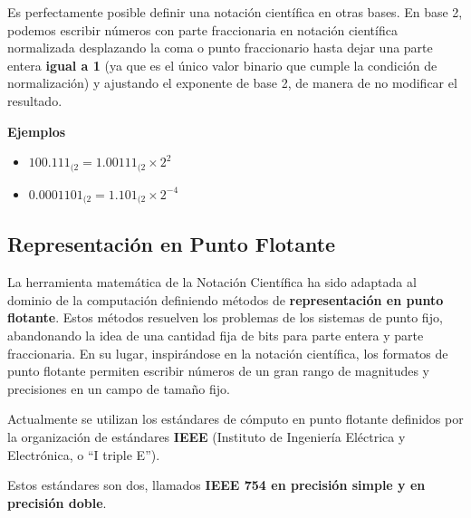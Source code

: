\documentclass[spanish,A4,]{article}
\begin{document}
Es perfectamente posible definir una notación científica en otras bases.
En base 2, podemos escribir números con parte fraccionaria en notación
científica normalizada desplazando la coma o punto fraccionario hasta
dejar una parte entera \textbf{igual a 1} (ya que es el único valor
binario que cumple la condición de normalización) y ajustando el
exponente de base 2, de manera de no modificar el resultado.

\textbf{Ejemplos}

\begin{itemize}
\itemsep1pt\parskip0pt
\item
  $100.111_{(2} = 1.00111_{(2} \times 2^2$
\item
  $0.0001101_{(2} = 1.101_{(2} \times 2^{-4}$
\end{itemize}

\subsection{Representación en Punto
Flotante}\label{representaciuxf3n-en-punto-flotante}

La herramienta matemática de la Notación Científica ha sido adaptada al
dominio de la computación definiendo métodos de \textbf{representación
en punto flotante}. Estos métodos resuelven los problemas de los
sistemas de punto fijo, abandonando la idea de una cantidad fija de bits
para parte entera y parte fraccionaria. En su lugar, inspirándose en la
notación científica, los formatos de punto flotante permiten escribir
números de un gran rango de magnitudes y precisiones en un campo de
tamaño fijo.

Actualmente se utilizan los estándares de cómputo en punto flotante
definidos por la organización de estándares \textbf{IEEE} (Instituto de
Ingeniería Eléctrica y Electrónica, o ``I triple E'').

Estos estándares son dos, llamados \textbf{IEEE 754 en precisión simple
y en precisión doble}.
\end{document}
